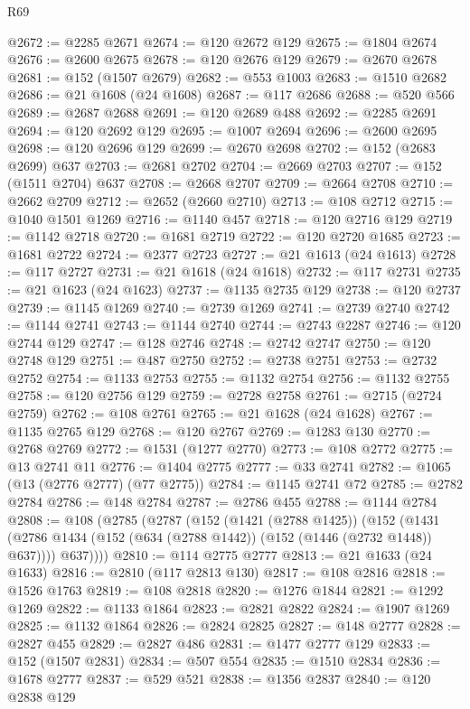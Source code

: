 \begin{lexlean}{R69}
\begin{coremodule}
@2672 := @2285 @2671
@2674 := @120 @2672 @129
@2675 := @1804 @2674
@2676 := @2600 @2675
@2678 := @120 @2676 @129
@2679 := @2670 @2678
@2681 := @152 (@1507 @2679)
@2682 := @553 @1003
@2683 := @1510 @2682
@2686 := @21 @1608 (@24 @1608)
@2687 := @117 @2686
@2688 := @520 @566
@2689 := @2687 @2688
@2691 := @120 @2689 @488
@2692 := @2285 @2691
@2694 := @120 @2692 @129
@2695 := @1007 @2694
@2696 := @2600 @2695
@2698 := @120 @2696 @129
@2699 := @2670 @2698
@2702 := @152 (@2683 @2699) @637
@2703 := @2681 @2702
@2704 := @2669 @2703
@2707 := @152 (@1511 @2704) @637
@2708 := @2668 @2707
@2709 := @2664 @2708
@2710 := @2662 @2709
@2712 := @2652 (@2660 @2710)
@2713 := @108 @2712
@2715 := @1040 @1501 @1269
@2716 := @1140 @457
@2718 := @120 @2716 @129
@2719 := @1142 @2718
@2720 := @1681 @2719
@2722 := @120 @2720 @1685
@2723 := @1681 @2722
@2724 := @2377 @2723
@2727 := @21 @1613 (@24 @1613)
@2728 := @117 @2727
@2731 := @21 @1618 (@24 @1618)
@2732 := @117 @2731
@2735 := @21 @1623 (@24 @1623)
@2737 := @1135 @2735 @129
@2738 := @120 @2737
@2739 := @1145 @1269
@2740 := @2739 @1269
@2741 := @2739 @2740
@2742 := @1144 @2741
@2743 := @1144 @2740
@2744 := @2743 @2287
@2746 := @120 @2744 @129
@2747 := @128 @2746
@2748 := @2742 @2747
@2750 := @120 @2748 @129
@2751 := @487 @2750
@2752 := @2738 @2751
@2753 := @2732 @2752
@2754 := @1133 @2753
@2755 := @1132 @2754
@2756 := @1132 @2755
@2758 := @120 @2756 @129
@2759 := @2728 @2758
@2761 := @2715 (@2724 @2759)
@2762 := @108 @2761
@2765 := @21 @1628 (@24 @1628)
@2767 := @1135 @2765 @129
@2768 := @120 @2767
@2769 := @1283 @130
@2770 := @2768 @2769
@2772 := @1531 (@1277 @2770)
@2773 := @108 @2772
@2775 := @13 @2741 @11
@2776 := @1404 @2775
@2777 := @33 @2741
@2782 := @1065 (@13 (@2776 @2777) (@77 @2775))
@2784 := @1145 @2741 @72
@2785 := @2782 @2784
@2786 := @148 @2784
@2787 := @2786 @455
@2788 := @1144 @2784
@2808 := @108
    (@2785
      (@2787
        (@152
          (@1421 (@2788 @1425))
          (@152
            (@1431 (@2786 @1434 (@152 (@634 (@2788 @1442)) (@152 (@1446 (@2732 @1448)) @637))))
            @637))))
@2810 := @114 @2775 @2777
@2813 := @21 @1633 (@24 @1633)
@2816 := @2810 (@117 @2813 @130)
@2817 := @108 @2816
@2818 := @1526 @1763
@2819 := @108 @2818
@2820 := @1276 @1844
@2821 := @1292 @1269
@2822 := @1133 @1864
@2823 := @2821 @2822
@2824 := @1907 @1269
@2825 := @1132 @1864
@2826 := @2824 @2825
@2827 := @148 @2777
@2828 := @2827 @455
@2829 := @2827 @486
@2831 := @1477 @2777 @129
@2833 := @152 (@1507 @2831)
@2834 := @507 @554
@2835 := @1510 @2834
@2836 := @1678 @2777
@2837 := @529 @521
@2838 := @1356 @2837
@2840 := @120 @2838 @129

\end{coremodule}
\end{lexlean}
